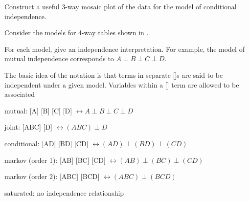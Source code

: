 \documentclass[10pt]{report}\usepackage[]{graphicx}\usepackage[]{color}
\begin{document}
\begin{Exercises}
\begin{enumerate*}
      \item Construct a useful 3-way mosaic plot of the data for the model of conditional independence.
      \begin{ans}
      \end{ans}
      
    \end{enumerate*}

\exercise Consider the models for 4-way tables shown in . 
  \begin{enumerate*}
    \item For each model, give an independence interpretation.  For example, the model of mutual
    independence corresponds to $A \perp B \perp C \perp D$.
    \begin{ans}
    The basic idea of the notation is that terms in separate []s are said to be independent
    under a given model. Variables within a [] term are allowed to be associated
    \begin{itemize*}
      \item mutual: [A]  [B]  [C]  [D] $\leftrightarrow A \perp B \perp C \perp D$
      \item joint: [ABC]  [D] $\leftrightarrow (ABC) \perp D$
      \item conditional: [AD]  [BD]  [CD] $\leftrightarrow (AD) \perp (BD) \perp (CD)$
      \item markov (order 1): [AB]  [BC]  [CD] $\leftrightarrow (AB) \perp (BC) \perp (CD)$
      \item markov (order 2): [ABC]  [BCD] $\leftrightarrow (ABC) \perp (BCD)$
      \item saturated: no independence relationship
    \end{itemize*}
    \end{ans}
    

\end{enumerate*}
\end{Exercises}
\end{document}
